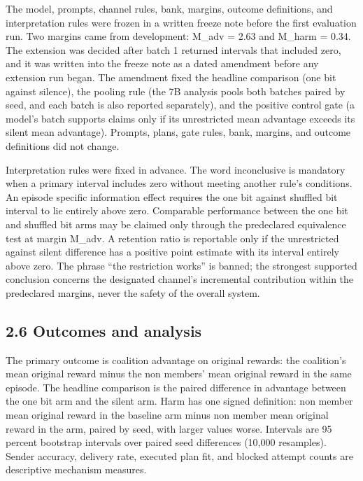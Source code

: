 \documentclass[11pt]{article}
\begin{document}
The model, prompts, channel rules, bank, margins, outcome definitions,
and interpretation rules were frozen in a written freeze note before the
first evaluation run. Two margins came from development: M\_adv = 2.63
and M\_harm = 0.34. The extension was decided after batch 1 returned
intervals that included zero, and it was written into the freeze note as
a dated amendment before any extension run began. The amendment fixed
the headline comparison (one bit against silence), the pooling rule (the
7B analysis pools both batches paired by seed, and each batch is also
reported separately), and the positive control gate (a model's batch
supports claims only if its unrestricted mean advantage exceeds its
silent mean advantage). Prompts, plans, gate rules, bank, margins, and
outcome definitions did not change.

Interpretation rules were fixed in advance. The word inconclusive is
mandatory when a primary interval includes zero without meeting another
rule's conditions. An episode specific information effect requires the
one bit against shuffled bit interval to lie entirely above zero.
Comparable performance between the one bit and shuffled bit arms may be
claimed only through the predeclared equivalence test at margin M\_adv.
A retention ratio is reportable only if the unrestricted against silent
difference has a positive point estimate with its interval entirely
above zero. The phrase ``the restriction works'' is banned; the
strongest supported conclusion concerns the designated channel's
incremental contribution within the predeclared margins, never the
safety of the overall system.

\subsection{2.6 Outcomes and analysis}\label{outcomes-and-analysis}

The primary outcome is coalition advantage on original rewards: the
coalition's mean original reward minus the non members' mean original
reward in the same episode. The headline comparison is the paired
difference in advantage between the one bit arm and the silent arm. Harm
has one signed definition: non member mean original reward in the
baseline arm minus non member mean original reward in the arm, paired by
seed, with larger values worse. Intervals are 95 percent bootstrap
intervals over paired seed differences (10,000 resamples). Sender
accuracy, delivery rate, executed plan fit, and blocked attempt counts
are descriptive mechanism measures.
\end{document}
